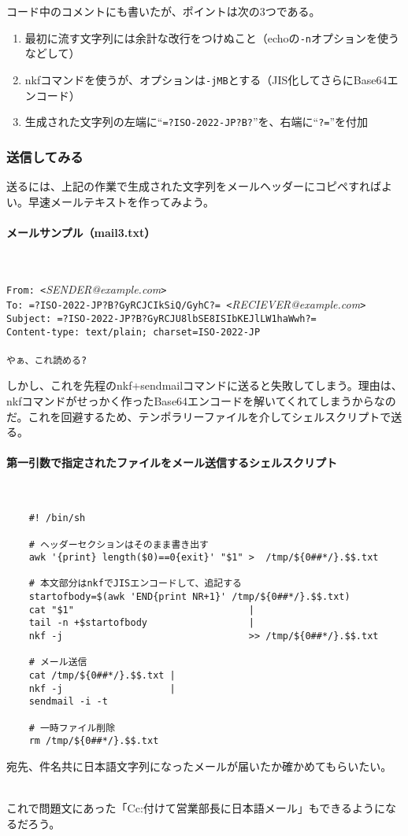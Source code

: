 コード中のコメントにも書いたが、ポイントは次の3つである。
\begin{enumerate}
  \item 最初に流す文字列には余計な改行をつけぬこと（echoの\verb|-n|オプションを使うなどして）
  \item nkfコマンドを使うが、オプションは\verb|-jMB|とする（JIS化してさらにBase64エンコード）
  \item 生成された文字列の左端に``\verb|=?ISO-2022-JP?B?|''を、右端に``\verb|?=|''を付加
\end{enumerate}

\subsubsection*{送信してみる}

送るには、上記の作業で生成された文字列をメールヘッダーにコピペすればよい。早速メールテキストを作ってみよう。

\paragraph{メールサンプル（mail3.txt）}　\\
\begin{frameboxit}{160.0mm}
	\verb|From: <|\textit{SENDER@example.com}\verb|>| \\
	\verb|To: =?ISO-2022-JP?B?GyRCJCIkSiQ/GyhC?= <|\textit{RECIEVER@example.com}\verb|>| \\
	\verb|Subject: =?ISO-2022-JP?B?GyRCJU8lbSE8ISIbKEJlLW1haWwh?=| \\
	\verb|Content-type: text/plain; charset=ISO-2022-JP| \\
	\verb|| \\
	\verb|やぁ、これ読める?|
\end{frameboxit}

しかし、これを先程のnkf+sendmailコマンドに送ると失敗してしまう。理由は、nkfコマンドがせっかく作ったBase64エンコードを解いてくれてしまうからなのだ。これを回避するため、テンポラリーファイルを介してシェルスクリプトで送る。

\paragraph*{第一引数で指定されたファイルをメール送信するシェルスクリプト}　\\
\begin{frameboxit}{160.0mm}
\begin{verbatim}
	#! /bin/sh
	
	# ヘッダーセクションはそのまま書き出す
	awk '{print} length($0)==0{exit}' "$1" >  /tmp/${0##*/}.$$.txt
	
	# 本文部分はnkfでJISエンコードして、追記する
	startofbody=$(awk 'END{print NR+1}' /tmp/${0##*/}.$$.txt)
	cat "$1"                               |
	tail -n +$startofbody                  |
	nkf -j                                 >> /tmp/${0##*/}.$$.txt
	
	# メール送信
	cat /tmp/${0##*/}.$$.txt |
	nkf -j                   |
	sendmail -i -t
	
	# 一時ファイル削除
	rm /tmp/${0##*/}.$$.txt
\end{verbatim}
\end{frameboxit}

宛先、件名共に日本語文字列になったメールが届いたか確かめてもらいたい。

　\\

これで問題文にあった「Cc:付けて営業部長に日本語メール」もできるようになるだろう。
